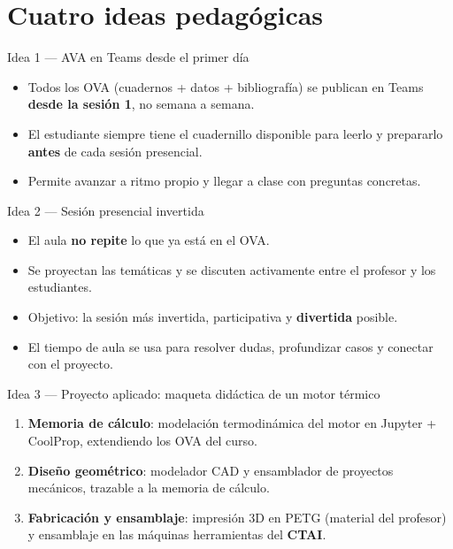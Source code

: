 \documentclass[aspectratio=169]{beamer}
\begin{document}
\section{Cuatro ideas pedagógicas}
\begin{frame}{Idea 1 — AVA en Teams desde el primer día}
  \begin{itemize}
    \item Todos los OVA (cuadernos + datos + bibliografía) se publican en Teams \textbf{desde la sesión 1},
      no semana a semana.
    \item El estudiante siempre tiene el cuadernillo disponible para leerlo y prepararlo \textbf{antes} de
      cada sesión presencial.
    \item Permite avanzar a ritmo propio y llegar a clase con preguntas concretas.
  \end{itemize}
\end{frame}

\begin{frame}{Idea 2 — Sesión presencial invertida}
  \begin{itemize}
    \item El aula \textbf{no repite} lo que ya está en el OVA.
    \item Se proyectan las temáticas y se discuten activamente entre el profesor y los estudiantes.
    \item Objetivo: la sesión más invertida, participativa y \textbf{divertida} posible.
    \item El tiempo de aula se usa para resolver dudas, profundizar casos y conectar con el proyecto.
  \end{itemize}
\end{frame}

\begin{frame}{Idea 3 — Proyecto aplicado: maqueta didáctica de un motor térmico}
  \begin{enumerate}
    \item \textbf{Memoria de cálculo}: modelación termodinámica del motor en Jupyter + CoolProp,
      extendiendo los OVA del curso.
    \item \textbf{Diseño geométrico}: modelador CAD y ensamblador de proyectos mecánicos, trazable a la
      memoria de cálculo.
    \item \textbf{Fabricación y ensamblaje}: impresión 3D en PETG (material del profesor) y ensamblaje en
      las máquinas herramientas del \textbf{CTAI}.
  \end{enumerate}
\end{frame}
\end{document}

